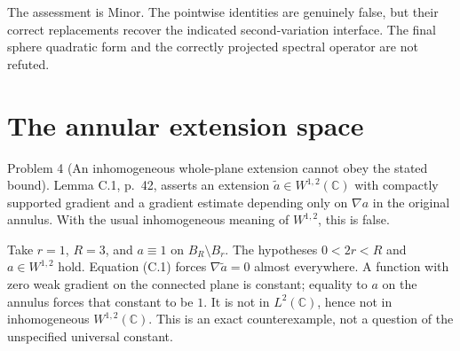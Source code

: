 \documentclass[10pt]{article}
\begin{document}
The assessment is Minor. The pointwise identities are genuinely false, but their correct replacements recover the indicated second-variation interface. The final sphere quadratic form and the correctly projected spectral operator are not refuted.\par
\section*{The annular extension space}
Problem 4 (An inhomogeneous whole-plane extension cannot obey the stated bound).  Lemma C.1, p. 42, asserts an extension \(\widetilde a\in W^{1,2}(\mathbb C)\) with compactly supported gradient and a gradient estimate depending only on \(\nabla a\) in the original annulus. With the usual inhomogeneous meaning of \(W^{1,2}\), this is false.\par
Take \(r=1\), \(R=3\), and \(a\equiv1\) on \(B_R\setminus B_r\). The hypotheses \(0<2r<R\) and \(a\in W^{1,2}\) hold. Equation (C.1) forces \(\nabla\widetilde a=0\) almost everywhere. A function with zero weak gradient on the connected plane is constant; equality to \(a\) on the annulus forces that constant to be \(1\). It is not in \(L^2(\mathbb C)\), hence not in inhomogeneous \(W^{1,2}(\mathbb C)\). This is an exact counterexample, not a question of the unspecified universal constant.\par
\end{document}
